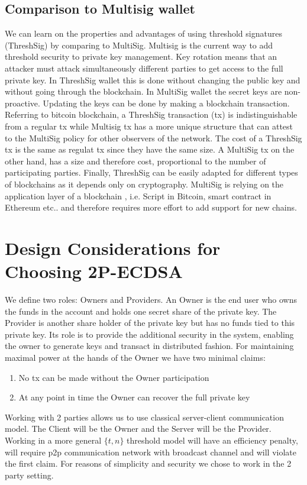 \documentclass[runningheads]{llncs}
\begin{document}
\subsection{Comparison to Multisig wallet}
We can learn on the properties and advantages of using threshold signatures (ThreshSig) by comparing to MultiSig. Multisig is the current way to add threshold security to private key management. Key rotation means that an attacker must attack simultaneously different parties to get access to the full private key. In ThreshSig wallet this is done without changing the public key and without going through the blockchain. In MultiSig wallet the secret keys are non-proactive. Updating the keys can be done by making a blockchain transaction. Referring to bitcoin blockchain, a ThreshSig transaction (tx) is indistinguishable from a regular tx while Multisig tx has a more unique structure that can attest to the MultiSig policy for other observers of the network. The cost of a ThreshSig tx is the same as regulat tx since they have the same size. A MultiSig tx on the other hand, has a size and therefore cost, proportional to the number of participating parties. Finally, ThreshSig can be easily adapted for different types of blockchains as it depends only on cryptography. MultiSig is relying on the application layer of a blockchain , i.e. Script in Bitcoin, smart contract in Ethereum etc.. and therefore requires more effort to add support for new chains.

\section{Design Considerations for Choosing 2P-ECDSA}
 We define two roles: Owners and Providers. An Owner is the end user who owns the funds in the account and holds one secret share of the private key. The Provider is another share holder of the private key but has no funds tied to this private key. Its role is to provide the additional security in the system, enabling the owner to generate keys and transact in distributed fashion. For maintaining maximal power at the hands of the Owner we have two minimal claims: 
\begin{enumerate}
    \item No tx can be made without the Owner participation
    \item At any point in time the Owner can recover the full private key
\end{enumerate}
Working with 2 parties allows us to use classical server-client communication model. The Client will be the Owner and the Server will be the Provider. Working in a more general $\{t,n\}$ threshold model will have an efficiency penalty, will require p2p communication network with broadcast channel and will violate the first claim. For reasons of simplicity and security we chose to work in the 2 party setting.
\end{document}
